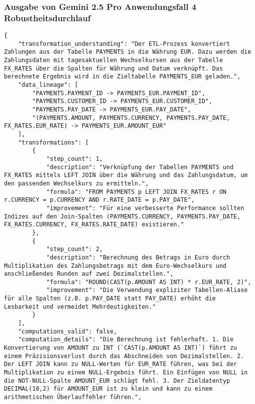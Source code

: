 \subsubsection{Ausgabe von Gemini 2.5 Pro Anwendungsfall 4 Robustheitsdurchlauf}\label{anhang:subsubsec:gemini_case4_prompt3}
\begin{lstlisting}[caption={Ausgabe: Gemini 2.5 Pro Anwendungsfall 4 Robustheitsdurchlauf},label={gemini_case4_prompt3}]
{
    "transformation_understanding": "Der ETL-Prozess konvertiert Zahlungen aus der Tabelle PAYMENTS in die Währung EUR. Dazu werden die Zahlungsdaten mit tagesaktuellen Wechselkursen aus der Tabelle FX_RATES über die Spalten für Währung und Datum verknüpft. Das berechnete Ergebnis wird in die Zieltabelle PAYMENTS_EUR geladen.",
    "data_lineage": [
        "PAYMENTS.PAYMENT_ID -> PAYMENTS_EUR.PAYMENT_ID",
        "PAYMENTS.CUSTOMER_ID -> PAYMENTS_EUR.CUSTOMER_ID",
        "PAYMENTS.PAY_DATE -> PAYMENTS_EUR.PAY_DATE",
        "(PAYMENTS.AMOUNT, PAYMENTS.CURRENCY, PAYMENTS.PAY_DATE, FX_RATES.EUR_RATE) -> PAYMENTS_EUR.AMOUNT_EUR"
    ],
    "transformations": [
        {
            "step_count": 1,
            "description": "Verknüpfung der Tabellen PAYMENTS und FX_RATES mittels LEFT JOIN über die Währung und das Zahlungsdatum, um den passenden Wechselkurs zu ermitteln.",
            "formula": "FROM PAYMENTS p LEFT JOIN FX_RATES r ON r.CURRENCY = p.CURRENCY AND r.RATE_DATE = p.PAY_DATE",
            "improvement": "Für eine verbesserte Performance sollten Indizes auf den Join-Spalten (PAYMENTS.CURRENCY, PAYMENTS.PAY_DATE, FX_RATES.CURRENCY, FX_RATES.RATE_DATE) existieren."
        },
        {
            "step_count": 2,
            "description": "Berechnung des Betrags in Euro durch Multiplikation des Zahlungsbetrags mit dem Euro-Wechselkurs und anschließendes Runden auf zwei Dezimalstellen.",
            "formula": "ROUND(CAST(p.AMOUNT AS INT) * r.EUR_RATE, 2)",
            "improvement": "Die Verwendung expliziter Tabellen-Aliase für alle Spalten (z.B. p.PAY_DATE statt PAY_DATE) erhöht die Lesbarkeit und vermeidet Mehrdeutigkeiten."
        }
    ],
    "computations_valid": false,
    "computation_details": "Die Berechnung ist fehlerhaft. 1. Die Konvertierung von AMOUNT zu INT (`CAST(p.AMOUNT AS INT)`) führt zu einem Präzisionsverlust durch das Abschneiden von Dezimalstellen. 2. Der LEFT JOIN kann zu NULL-Werten für EUR_RATE führen, was bei der Multiplikation zu einem NULL-Ergebnis führt. Ein Einfügen von NULL in die NOT-NULL-Spalte AMOUNT_EUR schlägt fehl. 3. Der Zieldatentyp DECIMAL(10,2) für AMOUNT_EUR ist zu klein und kann zu einem arithmetischen Überlauffehler führen.",

\end{lstlisting}

